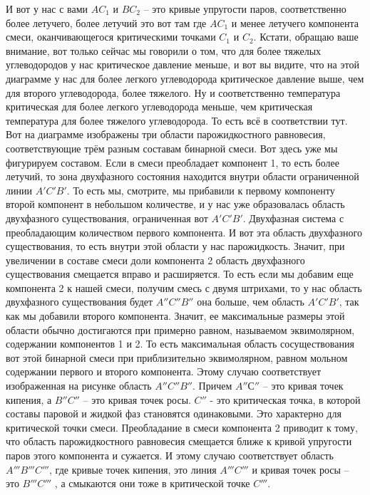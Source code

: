 \documentclass[main.tex]{subfiles}
\begin{document}
И вот у нас с вами $AC_1$ и $BC_2$ -- это кривые упругости паров, соответственно более летучего, более летучий это вот там где $AC_1$ и менее летучего компонента смеси, оканчивающегося критическими точками $C_1$ и $C_2$.
Кстати, обращаю ваше внимание, вот только сейчас мы говорили о том, что для более тяжелых углеводородов у нас критическое давление меньше, и вот вы видите, что на этой диаграмме у нас для более легкого углеводорода критическое давление выше, чем для второго углеводорода, более тяжелого.
Ну и соответственно температура критическая для более легкого углеводорода меньше, чем критическая температура для более тяжелого углеводорода.
То есть всё в соответствии тут.
Вот на диаграмме изображены три области парожидкостного равновесия, соответствующие трём разным составам бинарной смеси.
Вот здесь уже мы фигурируем составом.
Если в смеси преобладает компонент 1, то есть более летучий, то зона двухфазного состояния находится внутри области ограниченной линии $A' C'B'$.
То есть мы, смотрите, мы прибавили к первому компоненту второй компонент в небольшом количестве, и у нас уже образовалась область двухфазного существования, ограниченная вот $A'C'B'$.
Двухфазная система с преобладающим количеством первого компонента.
И вот эта область двухфазного существования, то есть внутри этой области у нас парожидкость.
Значит, при увеличении в составе смеси доли компонента 2 область двухфазного существования смещается вправо и расширяется.
То есть если мы добавим еще компонента 2 к нашей смеси, получим смесь с двумя штрихами, то у нас область двухфазного существования будет $A''C''B''$ она больше, чем область $A'C'B'$, так как мы добавили второго компонента.
Значит, ее максимальные размеры этой области обычно достигаются при примерно равном, называемом эквимолярном, содержании компонентов 1 и 2.
То есть максимальная область сосуществования вот этой бинарной смеси при приблизительно эквимолярном, равном мольном содержании первого и второго компонента.
Этому случаю соответствует изображенная на рисунке область $A''C''B''$. Причем $A''С''$ -- это кривая точек кипения, а $B''C''$ -- это кривая точек росы.
$C''$ - это критическая точка, в которой составы паровой и жидкой фаз становятся одинаковыми.
Это характерно для критической точки смеси.
Преобладание в смеси компонента 2 приводит к тому, что область парожидкостного равновесия смещается ближе к кривой упругости паров этого компонента и сужается.
И этому случаю соответствует область $A'''B'''C'''$, где кривые точек кипения, это линия $A'''C'''$ и кривая точек росы -- это $B'''C'''$ , а смыкаются они тоже в критической точке $C'''$.
\end{document}
